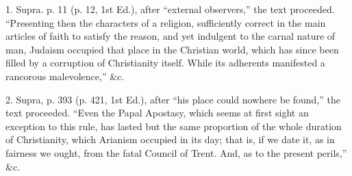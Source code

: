 1. Supra. p. 11 (p. 12, 1st Ed.), after ``external
observers,'' the text proceeded. ``Presenting then the
characters of a religion, sufficiently correct in the main articles of
faith to satisfy the reason, and yet indulgent to the carnal nature of
man, Judaism occupied that place in the Christian world, which has
since been filled by a corruption of Christianity itself. While its
adherents manifested a rancorous malevolence,'' \&c.

2. Supra, p. 393 (p. 421, 1st Ed.), after ``his place could
nowhere be found,'' the text proceeded. ``Even the Papal
Apostasy, which seems at first sight an exception to this rule, has
lasted but the same proportion of the whole duration of Christianity,
which Arianism occupied in its day; that is, if we date it, as in
fairness we ought, from the fatal Council of Trent. And, as to the
present perils,'' \&c.
